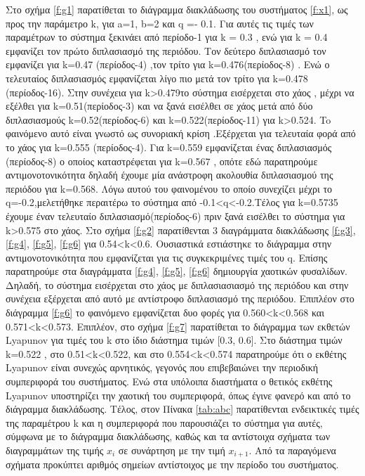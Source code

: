 	
Στο σχήμα \ref{f:g1} παρατίθεται το διάγραμμα διακλάδωσης του συστήματος \ref{f:x1}, ως προς την παράμετρο k, για a=1, b=2 και q =- 0.1. Για αυτές τις τιμές των παραμέτρων το σύστημα ξεκινάει από περίοδο-1 για k = 0.3 , ενώ για  k = 0.4 εμφανίζει τον πρώτο διπλασιασμό της περιόδου. Τον δεύτερο διπλασιασμό τον εμφανίζει για k=0.47 (περίοδος-4) ,τον τρίτο για k=0.476(περίοδος-8) . Ενώ ο τελευταίος διπλασιασμός εμφανίζεται λίγο πιο μετά τον τρίτο για k=0.478 (περίοδος-16). Στην συνέχεια για k>0.479το σύστημα εισέρχεται στο χάος , μέχρι να εξέλθει  για k=0.51(περίοδος-3) και να ξανά εισέλθει σε χάος μετά από δύο διπλασιασμούς k=0.52(περίοδος-6) και k=0.522(περίοδος-11) για k>0.524. To φαινόμενο αυτό είναι γνωστό ως συνοριακή κρίση .Εξέρχεται για τελευταία φορά από το χάος για k=0.555 (περίοδος-4). Για k=0.559 εμφανίζεται ένας διπλασιασμός (περίοδος-8) ο οποίος καταστρέφεται για k=0.567 , οπότε εδώ παρατηρούμε αντιμονοτονικότητα δηλαδή έχουμε μία ανάστροφη ακολουθία διπλασιασμού της περιόδου για k=0.568. Λόγω αυτού του φαινομένου το οποίο συνεχίζει μέχρι το q=-0.2,μελετήθηκε περαιτέρω το σύστημα από -0.1<q<-0.2.Τέλος για k=0.5735 έχουμε έναν τελευταίο διπλασιασμό(περίοδος-6) πριν ξανά εισέλθει το σύστημα για k>0.575 στο χάος.
Στο σχήμα \ref{f:g2} παρατίθενται 3 διαγράμματα διακλάδωσης \ref{f:g3}, \ref{f:g4}, \ref{f:g5}, \ref{f:g6}
για 0.54<k<0.6. Ουσιαστικά εστιάστηκε το διάγραμμα στην αντιμονοτονικότητα που εμφανίζεται για τις συγκεκριμένες τιμές του q. Επίσης παρατηρούμε στα διαγράμματα \ref{f:g4}, \ref{f:g5}, \ref{f:g6} δημιουργία χαοτικών φυσαλίδων. Δηλαδή, το σύστημα εισέρχεται στο χάος με διπλασιασιασμό της περιόδου και στην συνέχεια εξέρχεται από αυτό με αντίστροφο διπλασιασμό της περιόδου. Επιπλέον στο διάγραμμα \ref{f:g6} το φαινόμενο εμφανίζεται δυο φορές  για 0.560<k<0.568 και 0.571<k<0.573. 
Επιπλέον, στο σχήμα \ref{f:g7} παρατίθεται το διάγραμμα των εκθετών Lyapunov για τιμές του k στο ίδιο διάστημα τιμών [0.3, 0.6].  Στο διάστημα τιμών   k=0.522 , στο 0.51<k<0.522, και στο 0.554<k<0.574 παρατηρούμε ότι ο εκθέτης Lyapunov είναι συνεχώς αρνητικός, γεγονός που επιβεβαιώνει την περιοδική συμπεριφορά του συστήματος. Ενώ στα υπόλοιπα διαστήματα ο θετικός εκθέτης Lyapunov υποστηρίζει την χαοτική του συμπεριφορά, όπως έγινε φανερό και από το διάγραμμα διακλάδωσης.
Τέλος, στον Πίνακα \ref{tab:abc} παρατίθενται ενδεικτικές τιμές της παραμέτρου k και η συμπεριφορά που παρουσιάζει το σύστημα για αυτές, σύμφωνα με το διάγραμμα διακλάδωσης, καθώς και τα αντίστοιχα σχήματα των διαγραμμάτων της τιμής \(x_i\) σε συνάρτηση με την τιμή \(x_{i+1}\). Από τα παραγόμενα σχήματα προκύπτει αριθμός σημείων αντίστοιχος με την περίοδο του συστήματος.


